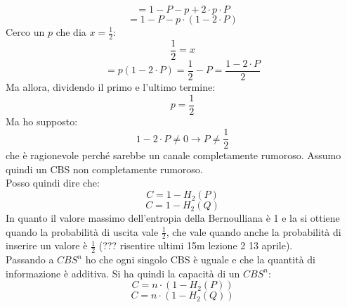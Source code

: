 \documentclass[a4paper,12pt, oneside]{book}
\begin{document}
\[=1-P-p+2\cdot p\cdot P\]
\[=1-P-p\cdot (1-2\cdot P)\]
Cerco un $p$ che dia $x=\frac{1}{2}$:
\[\frac{1}{2}=x\]
\[=p(1-2\cdot P)=\frac{1}{2}-P=\frac{1-2\cdot P}{2}\]
Ma allora, dividendo il primo e l'ultimo termine:
\[p=\frac{1}{2}\]
Ma ho supposto:
\[1-2\cdot P\neq 0\to P\neq \frac{1}{2}\]
che è ragionevole perché sarebbe un canale completamente rumoroso. Assumo quindi
un CBS non completamente rumoroso.\\
Posso quindi dire che:
\[C=1-H_2(P)\]
\[C=1-H_2(Q)\]
In quanto il valore massimo dell'entropia della Bernoulliana è 1 e la si ottiene
quando la probabilità di uscita vale $\frac{1}{2}$, che vale quando anche la
probabilità di inserire un valore è $\frac{1}{2}$ (??? risentire ultimi 15m
lezione 2 13 aprile).\\
Passando a $CBS^n$ ho che ogni singolo CBS è uguale e che la quantità di
informazione è additiva. Si ha quindi la capacità di un $CBS^n$:
\[C=n\cdot \left(1-H_2(P)\right)\]
\[C=n\cdot \left(1-H_2(Q)\right)\]
\end{document}
